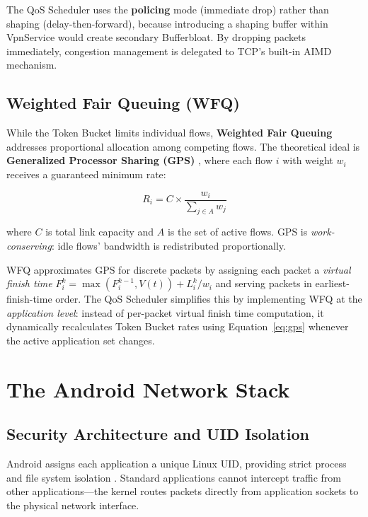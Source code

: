 The QoS Scheduler uses the \textbf{policing} mode (immediate drop) rather than shaping (delay-then-forward), because introducing a shaping buffer within VpnService would create secondary Bufferbloat. By dropping packets immediately, congestion management is delegated to TCP's built-in AIMD mechanism.

\subsection{Weighted Fair Queuing (WFQ)}
\label{subsec:wfq}

While the Token Bucket limits individual flows, \textbf{Weighted Fair Queuing} addresses proportional allocation among competing flows. The theoretical ideal is \textbf{Generalized Processor Sharing (GPS)} \cite{parekh_1993}, where each flow $i$ with weight $w_i$ receives a guaranteed minimum rate:

\begin{equation}
R_i = C \times \frac{w_i}{\sum_{j \in A} w_j}
\label{eq:gps}
\end{equation}

\noindent where $C$ is total link capacity and $A$ is the set of active flows. GPS is \textit{work-conserving}: idle flows' bandwidth is redistributed proportionally.

WFQ \cite{demers_1989} approximates GPS for discrete packets by assigning each packet a \textit{virtual finish time} $F_i^k = \max(F_i^{k-1}, V(t)) + L_i^k / w_i$ and serving packets in earliest-finish-time order. The QoS Scheduler simplifies this by implementing WFQ at the \textit{application level}: instead of per-packet virtual finish time computation, it dynamically recalculates Token Bucket rates using Equation~\ref{eq:gps} whenever the active application set changes.

\section{The Android Network Stack}
\label{sec:android_stack}

\subsection{Security Architecture and UID Isolation}

Android assigns each application a unique Linux UID, providing strict process and file system isolation \cite{android_vpnservice}. Standard applications cannot intercept traffic from other applications---the kernel routes packets directly from application sockets to the physical network interface.

